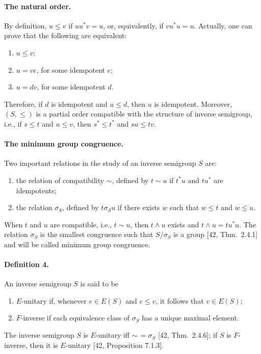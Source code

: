 \documentclass[10pt,a4paper]{amsart}
\begin{document}
\paragraph{The natural order.} By definition, $u\le v$ if $uu^*v=u$, or, equivalently, if $vu^*u=u$. Actually, one can prove that the following are equivalent:
\begin{enumerate}
\item $u\le v$;
\item $u=ve$, for some idempotent $e$;
\item $u=dv$, for some idempotent $d$.
\end{enumerate}
Therefore, if $d$ is idempotent and $u\le d$, then $u$ is idempotent. Moreover, $(S,\le)$ is a partial order compatible with the structure of inverse semigroup, i.e., if $s\le t$ and $u\le v$, then $s^*\le t^*$ and $su\le tv$.
\paragraph{The minimum group congruence.} Two important relations in the study of an inverse semigroup $S$ are:
\begin{enumerate}
\item the relation of compatibility $\sim$, defined by $t\sim u$ if $t^*u$ and $tu^*$ are idempotents;
\item the relation $\sigma_S$, defined by $t\mathrel{\sigma_S}u$ if there exists $w$ such that $w\le t$ and $w\le u$.
\end{enumerate}
When $t$ and $u$ are compatible, i.e., $t\sim u$, then $t\land u$ exists and $t\land u=tu^*u$. The relation $\sigma_S$ is the smallest congruence such that $S/\sigma_S$ is a group [42, Thm.\ 2.4.1] and will be called minimum group congruence.
\paragraph{Definition 4.} An inverse semigroup $S$ is said to be
\begin{enumerate}
\item $E$-unitary if, whenever $e\in E(S)$ and $e\le v$, it follows that $v\in E(S)$;
\item $F$-inverse if each equivalence class of $\sigma_S$ has a unique maximal element.
\end{enumerate}
The inverse semigroup $S$ is $E$-unitary iff $\sim\,=\sigma_S$ [42, Thm.\ 2.4.6]; if $S$ is $F$-inverse, then it is $E$-unitary [42, Proposition 7.1.3].
\end{document}
